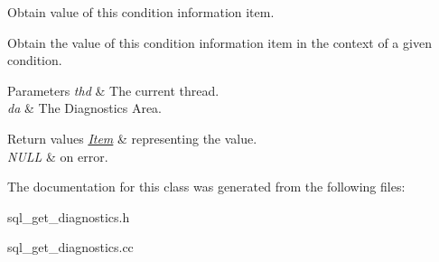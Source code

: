 Obtain value of this condition information item.

Obtain the value of this condition information item in the context of a given condition.


\begin{DoxyParams}{Parameters}
{\em thd} & The current thread. \\
\hline
{\em da} & The Diagnostics Area.\\
\hline
\end{DoxyParams}

\begin{DoxyRetVals}{Return values}
{\em \mbox{\hyperlink{classItem}{Item}}} & representing the value. \\
\hline
{\em N\+U\+LL} & on error. \\
\hline
\end{DoxyRetVals}


The documentation for this class was generated from the following files\+:\begin{DoxyCompactItemize}
\item 
sql\+\_\+get\+\_\+diagnostics.\+h\item 
sql\+\_\+get\+\_\+diagnostics.\+cc\end{DoxyCompactItemize}
